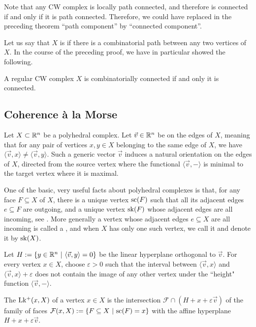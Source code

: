 Note that any CW complex is locally path connected, and therefore is connected if and only if it is path connected.
Therefore, we could have replaced in the preceding theorem ``path component'' by ``connected component''.

Let us say that $X$ is  if there is a combinatorial path between any two vertices of $X$. 
In the course of the preceding proof, we have in particular showed the following.
\begin{corollary}
    \label{cor:combinatorially-connected}
    A regular CW complex $X$ is combinatorially connected if and only it is connected.
\end{corollary}


\subsection{Coherence \`a la Morse}

Let $X\subset \mathbb R^n$ be a polyhedral complex. 
Let $\vec v \in \mathbb R^n$ be  on the edges of $X$, meaning that for any pair of vertices $x,y \in X$ belonging to the same edge of $X$, we have $\langle \vec v , x \rangle \neq \langle \vec v, y\rangle$.  
Such a generic vector $\vec v$ induces a natural orientation on the edges of $X$, directed from the source vertex where the functional $\langle \vec v, - \rangle$ is minimal to the target vertex where it is maximal. 

One of the basic, very useful facts about polyhedral complexes is that, for any face $F \subseteq X$ of $X$, there is a unique  vertex $\mathrm{sc}(F)$ such that all its adjacent edges $e \subseteq F$ are outgoing, and a unique  vertex $\mathrm{sk}(F)$ whose adjacent edges are all incoming, see \cite[Thm.~3.7]{Ziegler95}.
More generally  a vertex whose adjacent edges $e \subseteq X$ are all incoming is called a , and when $X$ has only one such vertex, we call it  and denote it by $\mathrm{sk}(X)$.

Let $H:=\{y \in \mathbb R^n \ | \ \langle \vec v , y \rangle = 0\}$ be the linear hyperplane orthogonal to $\vec v$.  
For every vertex $x \in X$, choose $\varepsilon >0$ such that the interval between $\langle \vec v , x \rangle$ and $\langle \vec v , x \rangle + \varepsilon$ does not contain the image of any other vertex under the ``height" function $\langle \vec v, - \rangle$. 

\begin{definition}
    The  $\operatorname{Lk^{+}}(x,X)$ of a vertex $x \in X$ is the intersection $\mathcal{F} \cap (H+x+\varepsilon \vec v)$ of the family of faces $\mathcal{F}(x,X):=\{ F \subseteq X \ | \ \mathrm{sc}(F)=x \}$ with the affine hyperplane $H+x+\varepsilon \vec v$. 
\end{definition}

